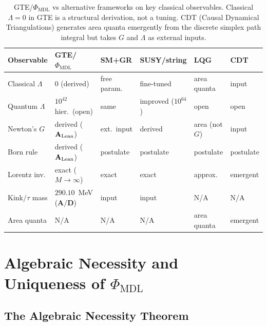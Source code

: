\documentclass[11pt]{article}
\theoremstyle{remark}
\newcommand{\PHIMDL}{\Phi_{\mathrm{MDL}}}
\newcommand{\CatAL}{\ensuremath{\textbf{A}_{\rm Lean}}}
\newcommand{\CatAD}{\textbf{A/D}}
\begin{document}
\begin{table}[h]
\footnotesize
\centering
\renewcommand{\arraystretch}{1.2}
\begin{tabular}{@{}lP{2.3cm}P{1.9cm}P{2.1cm}P{1.8cm}P{1.8cm}@{}}
\toprule
\textbf{Observable} & \textbf{GTE/$\PHIMDL$} & \textbf{SM+GR} & \textbf{SUSY/string} & \textbf{LQG} & \textbf{CDT}\\
\midrule
Classical $\Lambda$ & $0$ (derived) & free param. & fine-tuned & area quanta & input\\
Quantum $\Lambda$ & $10^{42}$ hier.\ (open) & same & improved ($10^{64}$) & open & open\\
Newton's $G$ & derived ($\CatAL$) & ext.\ input & derived & area (not $G$) & input\\
Born rule & derived ($\CatAL$) & postulate & postulate & postulate & postulate\\
Lorentz inv. & exact ($M\!\to\!\infty$) & exact & exact & approx. & emergent\\
Kink/$\tau$ mass & $290.10$~MeV ($\CatAD$) & input & input & N/A & N/A\\
Area quanta & N/A & N/A & N/A & area quanta & emergent\\
\bottomrule
\end{tabular}
\caption{GTE/$\PHIMDL$ vs alternative frameworks on key classical observables.
Classical $\Lambda = 0$ in GTE is a structural derivation, not a tuning.
CDT (Causal Dynamical Triangulations) generates area quanta emergently from the
discrete simplex path integral but takes $G$ and $\Lambda$ as external inputs.}
\label{tab:framework_compare}
\end{table}

\section{Algebraic Necessity and Uniqueness of \texorpdfstring{$\PHIMDL$}{Phi-MDL}}
\label{sec:noca}

\subsection{The Algebraic Necessity Theorem}
\label{sec:algebraic_necessity}
\end{document}
